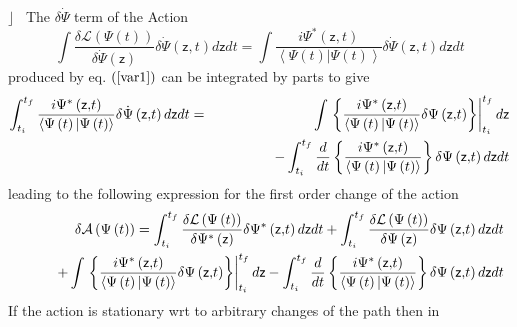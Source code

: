 \documentclass[aps,preprint]{revtex4}
\begin{document}
$\rfloor $ \ The $\delta \dot{\Psi}$ term of the Action 
\begin{equation}
\int \frac{\delta \mathcal{L}\left( \Psi \left( t\right) \right) }{\delta 
\dot{\Psi}\left( \mathsf{z}\right) }\delta \dot{\Psi}\left( \mathsf{z,}%
t\right) d\mathsf{z}dt\mathsf{=}\int \frac{i\Psi ^{\ast }\left( \mathsf{z,}%
t\right) }{\left\langle \Psi \left( t\right) |\Psi \left( t\right)
\right\rangle }\delta \dot{\Psi}\left( \mathsf{z,}t\right) d\mathsf{z}dt
\end{equation}%
produced by eq. $\left( \ref{var1}\right) $ can be integrated by parts to
give 
\begin{eqnarray}
\int_{t_{i}}^{t_{f}}\frac{i\Psi ^{\ast }\left( \mathsf{z,}t\right) }{%
\left\langle \Psi \left( t\right) |\Psi \left( t\right) \right\rangle }%
\delta \dot{\Psi}\left( \mathsf{z,}t\right) d\mathsf{z}dt &=&\int \left.
\left\{ \frac{i\Psi ^{\ast }\left( \mathsf{z,}t\right) }{\left\langle \Psi
\left( t\right) |\Psi \left( t\right) \right\rangle }\delta \Psi \left( 
\mathsf{z,}t\right) \right\} \right| _{t_{i}}^{t_{f}}d\mathsf{z}  \notag \\
&&\qquad \qquad -\int_{t_{i}}^{t_{f}}\frac{d}{dt}\left\{ \frac{i\Psi ^{\ast
}\left( \mathsf{z,}t\right) }{\left\langle \Psi \left( t\right) |\Psi \left(
t\right) \right\rangle }\right\} \delta \Psi \left( \mathsf{z,}t\right) d%
\mathsf{z}dt
\end{eqnarray}%
leading to the following expression for the first order change of the action 
\begin{eqnarray}
&&\delta \mathcal{A}\left( \Psi \left( t\right) \right) =\int_{t_{i}}^{t_{f}}%
\frac{\delta \mathcal{L}\left( \Psi \left( t\right) \right) }{\delta \Psi
^{\ast }\left( \mathsf{z}\right) }\delta \Psi ^{\ast }\left( \mathsf{z,}%
t\right) d\mathsf{z}dt+\int_{t_{i}}^{t_{f}}\frac{\delta \mathcal{L}\left(
\Psi \left( t\right) \right) }{\delta \Psi \left( \mathsf{z}\right) }\delta
\Psi \left( \mathsf{z,}t\right) d\mathsf{z}dt  \notag \\
&&\qquad +\int \left. \left\{ \frac{i\Psi ^{\ast }\left( \mathsf{z,}t\right) 
}{\left\langle \Psi \left( t\right) |\Psi \left( t\right) \right\rangle }%
\delta \Psi \left( \mathsf{z,}t\right) \right\} \right| _{t_{i}}^{t_{f}}d%
\mathsf{z}-\int_{t_{i}}^{t_{f}}\frac{d}{dt}\left\{ \frac{i\Psi ^{\ast
}\left( \mathsf{z,}t\right) }{\left\langle \Psi \left( t\right) |\Psi \left(
t\right) \right\rangle }\right\} \delta \Psi \left( \mathsf{z,}t\right) d%
\mathsf{z}dt
\end{eqnarray}%
If the action is stationary wrt to arbitrary changes of the path then in
\end{document}
